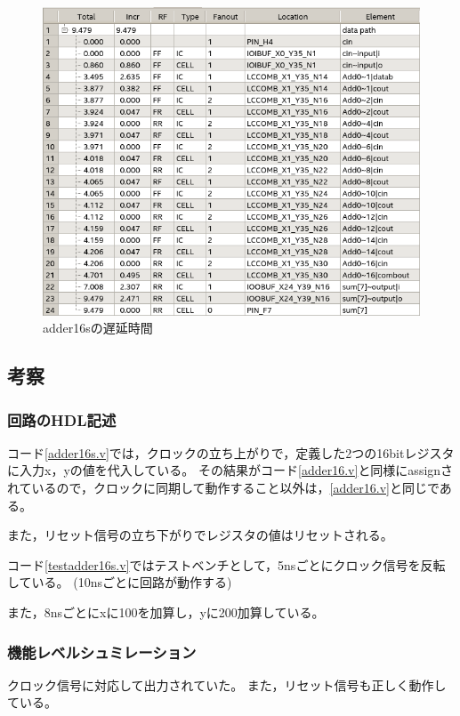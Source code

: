 \begin{figure}[H]
  \centering
  \includegraphics[width=\linewidth]{./src/adder16s/adder16sTiming.png}
  \caption{adder16sの遅延時間}
  \label{adder16sの遅延時間}
\end{figure}

\subsection{考察}
\subsubsection{回路のHDL記述}
コード\ref{adder16s.v}では，クロックの立ち上がりで，定義した2つの16bitレジスタに入力x，yの値を代入している。
その結果がコード\ref{adder16.v}と同様にassignされているので，クロックに同期して動作すること以外は，\ref{adder16.v}と同じである。

また，リセット信号の立ち下がりでレジスタの値はリセットされる。

コード\ref{testadder16s.v}ではテストベンチとして，5nsごとにクロック信号を反転している。
(10nsごとに回路が動作する)

また，8nsごとにxに100を加算し，yに200加算している。

\subsubsection{機能レベルシュミレーション}
クロック信号に対応して出力されていた。
また，リセット信号も正しく動作している。


